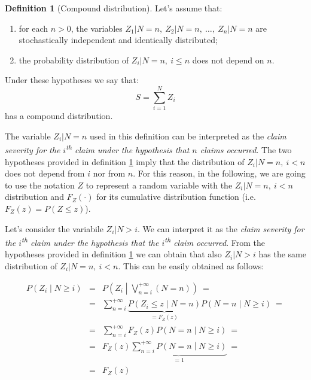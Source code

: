 \documentclass[a4paper, nobind]{templates/ociamthesis}
\providecommand{\tightlist}{%
  \setlength{\itemsep}{0pt}\setlength{\parskip}{0pt}}
\theoremstyle{definition}
\newtheorem{definition}{Definition}[chapter]
\theoremstyle{definition}
\theoremstyle{definition}
\theoremstyle{remark}
\begin{document}
\begin{definition}[Compound distribution]
\label{def:comp-dist} \iffalse (Compound distribution) \fi{}
Let's assume that:

\begin{enumerate}
\def\labelenumi{\arabic{enumi}.}
\tightlist
\item
  for each \(n>0\), the variables \(Z_1|N=n,\ Z_2|N=n,\ \dots,\ Z_n|N=n\) are stochastically independent and identically distributed;
\item
  the probability distribution of \(Z_i|N=n, \ i\le n\) does not depend on \(n\).
\end{enumerate}

Under these hypotheses we say that:
\[
S = \sum_{i=1}^{N}{Z_i}
\]
has a compound distribution.
\end{definition}

The variable \(Z_i|N=n\) used in this definition can be interpreted as the \emph{claim severity for the \(i\)\textsuperscript{th} claim under the hypothesis that \(n\) claims occurred}. The two hypotheses provided in definition \ref{def:comp-dist} imply that the distribution of \(Z_i|N=n, \ i<n\) does not depend from \(i\) nor from \(n\). For this reason, in the following, we are going to use the notation \(Z\) to represent a random variable with the \(Z_i|N=n, \ i<n\) distribution and \(F_Z(\cdot)\) for its cumulative distribution function (i.e.~\(F_Z(z) = P(Z\le z)\)).

Let's consider the variabile \(Z_i|N>i\). We can interpret it as the \emph{claim severity for the \(i\)\textsuperscript{th} claim under the hypothesis that the \(i\)\textsuperscript{th} claim occurred}. From the hypotheses provided in definition \ref{def:comp-dist} we can obtain that also \(Z_i|N>i\) has the same distribution of \(Z_i|N=n, \ i<n\). This can be easily obtained as follows:

\begin{eqnarray}
\label{eq:z1}
P\left(Z_i \middle| N\ge i \right) & = & P\left(Z_i \middle| \bigvee_{n = i}^{+\infty}{(N=n)}\right)
\ = \\ \label{eq:z2} & = &
\sum_{n=i}^{+\infty}{ \underbrace{P\left(Z_i\le z \middle| N=n\right)}_{=F_Z(z)} P\left( N = n \middle| N\ge i \right)}
\ = \\ \label{eq:z3} & = &
\sum_{n=i}^{+\infty}{ F_Z(z) P\left( N = n \middle| N\ge i \right)}
\ = \\ \label{eq:z4} & = &
F_Z(z) \underbrace{\sum_{n=i}^{+\infty}{P\left( N = n \middle| N\ge i \right)}}_{=1}
\ = \\ \nonumber & = &
F_Z(z)
\end{eqnarray}
\end{document}
